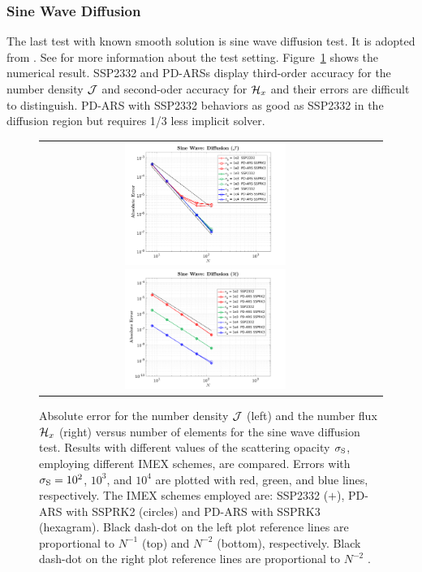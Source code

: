 \subsubsection{Sine Wave Diffusion}
The last test with known smooth solution is sine wave diffusion test.
It is adopted from \cite{radice_etal_2013}.
See \cite{chu_2018} for more information about the test setting.
Figure~\ref{fig:SineWaveDiffusionJ} shows the numerical result.
SSP2332 and PD-ARSs display third-order accuracy for the number density $\mathcal{J}$ and second-oder accuracy for $\mathcal{H}_{x}$ and their errors are difficult to distinguish.
PD-ARS with SSP2332 behaviors as good as SSP2332 in the diffusion region but requires 1/3 less implicit solver.
\begin{figure}[h]
  \centering
  \begin{tabular}{cc}
    \includegraphics[width=0.5\textwidth]{figures/SineWaveDiffusionJ}
    \includegraphics[width=0.5\textwidth]{figures/SineWaveDiffusionH}
  \end{tabular}
   \caption{Absolute error for the number density $\mathcal{J}$ (left) and the number flux $\mathcal{H}_{x}$ (right) versus number of elements for the sine wave diffusion test.  Results with different values of the scattering opacity $\sigma_{{\rm S}}$, employing different IMEX schemes, are compared.  Errors with $\sigma_{{\rm S}}=10^{2}$, $10^{3}$, and $10^{4}$ are plotted with red, green, and blue lines, respectively.  The IMEX schemes employed are:  SSP2332 ($+$), PD-ARS with SSPRK2 (circles) and PD-ARS with SSPRK3 (hexagram). Black dash-dot on the left plot reference lines are proportional to $N^{-1}$ (top) and $N^{-2}$ (bottom), respectively. Black dash-dot on the right plot reference lines are proportional to $N^{-2}$ .}
   \label{fig:SineWaveDiffusionJ}
\end{figure}


